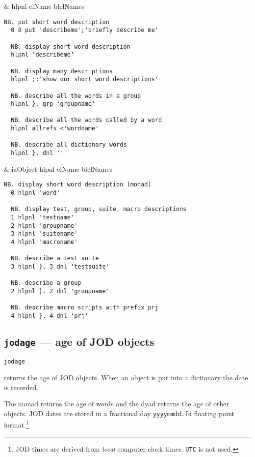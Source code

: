 \begin{wordhead}
\monad & hlpnl clName \argsep blclNames \\
\end{wordhead}
\begin{lstlisting}[frame=single,framerule=0pt] 
  NB. put short word description 
  0 8 put 'describeme';'briefly describe me' 

  NB. display short word description
  hlpnl 'describeme' 

  NB. display many descriptions
  hlpnl ;:'show our short word descriptions'

  NB. describe all the words in a group
  hlpnl }. grp 'groupname'

  NB. describe all the words called by a word
  hlpnl allrefs <'wordname'

  NB. describe all dictionary words
  hlpnl }. dnl ''
\end{lstlisting}

\begin{wordhead}
\dyad & iaObject hlpnl clName \argsep blclNames \\
\end{wordhead}
\begin{lstlisting}[frame=single,framerule=0pt] 
  NB. display short word description (monad)
  0 hlpnl 'word' 

  NB. display test, group, suite, macro descriptions
  1 hlpnl 'testname'
  2 hlpnl 'groupname'
  3 hlpnl 'suitename'
  4 hlpnl 'macroname'

  NB. describe a test suite
  3 hlpnl }. 3 dnl 'testsuite'

  NB. describe a group
  2 hlpnl }. 2 dnl 'groupname'

  NB. describe macro scripts with prefix prj
  4 hlpnl }. 4 dnl 'prj'
\end{lstlisting}


\subsection{\texttt{jodage} --- age of JOD objects}  

\hypertarget{il:jodage}{\texttt{jodage}} returns the age of JOD objects.  When an object is 
put into a dictionary the date is recorded. 

The monad returns the age of words and the dyad returns the age of other objects.  
JOD dates are stored in a fractional day \verb|yyyymmdd.fd| floating point format.\footnote{JOD times
are derived from \emph{local} computer clock times. \texttt{UTC} is not used.
}    

